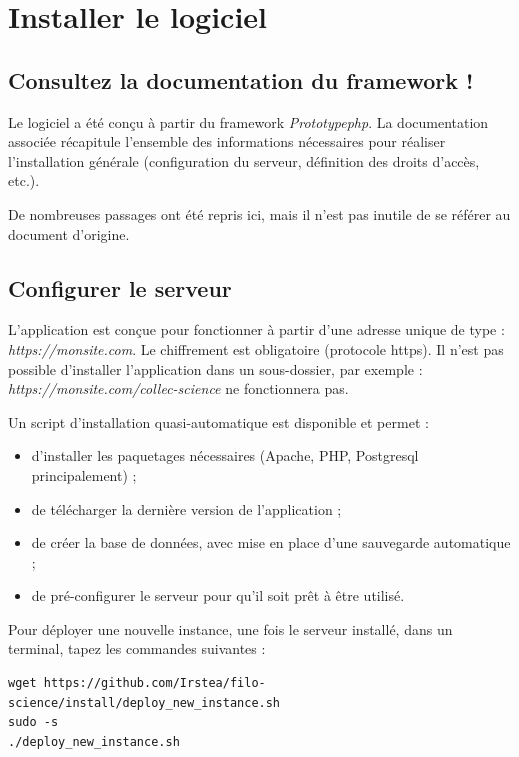 \chapter{Installer le logiciel}

\section{Consultez la documentation du framework !}

Le logiciel a été conçu à partir du framework \textit{Prototypephp}. La documentation associée \cite{pphp-doc} récapitule l'ensemble des informations nécessaires pour réaliser l'installation générale (configuration du serveur, définition des droits d'accès, etc.).

De nombreuses passages ont été repris ici, mais il n'est pas inutile de se référer au document d'origine. 

\section{Configurer le serveur}

L'application est conçue pour fonctionner à partir d'une adresse unique de type : {\NoAutoSpacing\textit{https://monsite.com}}. Le chiffrement est obligatoire (protocole https). Il n'est pas possible d'installer l'application dans un sous-dossier, par exemple : {\NoAutoSpacing \textit{https://monsite.com/collec-science}} ne fonctionnera pas.

Un script d'installation quasi-automatique est disponible et permet :
\begin{itemize}
\item d'installer les paquetages nécessaires (Apache, PHP, Postgresql principalement) ;
\item de télécharger la dernière version de l'application ;
\item de créer la base de données, avec mise en place d'une sauvegarde automatique ;
\item de pré-configurer le serveur pour qu'il soit prêt à être utilisé.
\end{itemize}

Pour déployer une nouvelle instance, une fois le serveur installé, dans un terminal, tapez les commandes suivantes :
\begin{lstlisting}
wget https://github.com/Irstea/filo-science/install/deploy_new_instance.sh
sudo -s
./deploy_new_instance.sh
\end{lstlisting}

